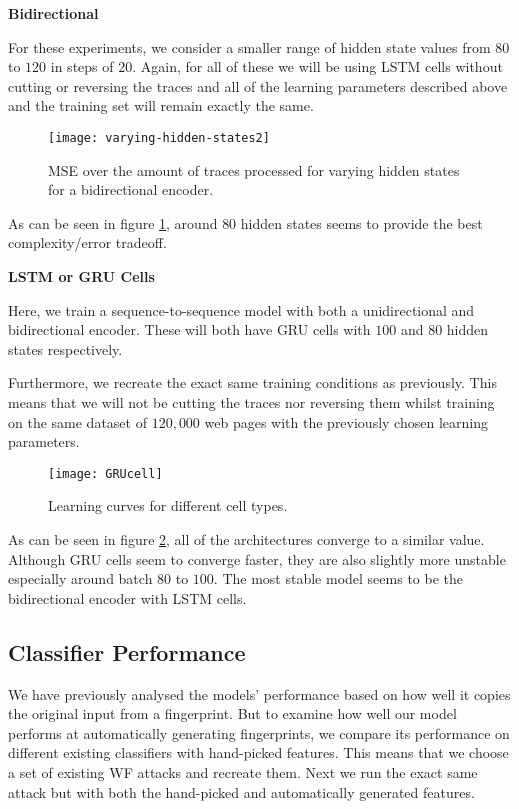 \newpage

\noindent
\textbf{Bidirectional}

For these experiments, we consider a smaller range of hidden state values from $80$ to $120$ in steps of $20$.
Again, for all of these we will be using LSTM cells without cutting or reversing the traces and all of the learning parameters described above and the training set will remain exactly the same.

\begin{figure}[ht]
  \centering
  \texttt{[image: varying-hidden-states2]}
  \caption{MSE over the amount of traces processed for varying hidden states for a bidirectional encoder.}
  \label{fig:varying-hidden-states2}
\end{figure}

\noindent
As can be seen in figure \ref{fig:varying-hidden-states2}, around $80$ hidden states seems to provide the best complexity/error tradeoff.

\noindent
\textbf{LSTM or GRU Cells}

Here, we train a sequence-to-sequence model with both a unidirectional and bidirectional encoder.
These will both have GRU cells with $100$ and $80$ hidden states respectively.

Furthermore, we recreate the exact same training conditions as previously.
This means that we will not be cutting the traces nor reversing them whilst training on the same dataset of $120,000$ web pages with the previously chosen learning parameters.

\begin{figure}[ht]
  \centering
  \texttt{[image: GRUcell]}
  \caption{Learning curves for different cell types.}
  \label{fig:varying-cell-type}
\end{figure}

As can be seen in figure \ref{fig:varying-cell-type}, all of the architectures converge to a similar value.
Although GRU cells seem to converge faster, they are also slightly more unstable especially around batch $80$ to $100$.
The most stable model seems to be the bidirectional encoder with LSTM cells.

\subsection{Classifier Performance}

We have previously analysed the models' performance based on how well it copies the original input from a fingerprint.
But to examine how well our model performs at automatically generating fingerprints, we compare its performance on different existing classifiers with hand-picked features.
This means that we choose a set of existing WF attacks and recreate them.
Next we run the exact same attack but with both the hand-picked and automatically generated features.

